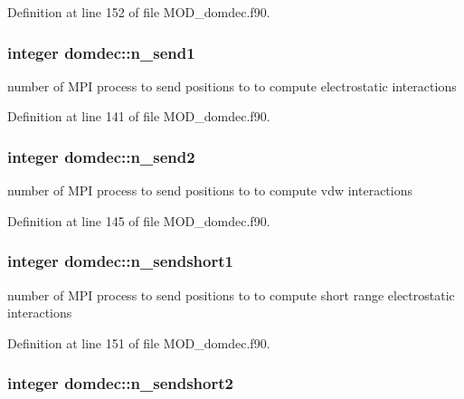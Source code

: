 Definition at line 152 of file M\-O\-D\-\_\-domdec.\-f90.

\hypertarget{classdomdec_aa8487a458ef4e84212822190663db9a8}{
\subsubsection[{n\-\_\-send1}]{\setlength{\rightskip}{0pt plus 5cm}integer domdec\-::n\-\_\-send1}}\label{classdomdec_aa8487a458ef4e84212822190663db9a8}


number of M\-P\-I process to send positions to to compute electrostatic interactions 



Definition at line 141 of file M\-O\-D\-\_\-domdec.\-f90.

\hypertarget{classdomdec_a0f486e85808300fa8cc875848802e6bb}{
\subsubsection[{n\-\_\-send2}]{\setlength{\rightskip}{0pt plus 5cm}integer domdec\-::n\-\_\-send2}}\label{classdomdec_a0f486e85808300fa8cc875848802e6bb}


number of M\-P\-I process to send positions to to compute vdw interactions 



Definition at line 145 of file M\-O\-D\-\_\-domdec.\-f90.

\hypertarget{classdomdec_a10cc7f1b63fcc120ac78969e44d907fa}{
\subsubsection[{n\-\_\-sendshort1}]{\setlength{\rightskip}{0pt plus 5cm}integer domdec\-::n\-\_\-sendshort1}}\label{classdomdec_a10cc7f1b63fcc120ac78969e44d907fa}


number of M\-P\-I process to send positions to to compute short range electrostatic interactions 



Definition at line 151 of file M\-O\-D\-\_\-domdec.\-f90.

\hypertarget{classdomdec_a2a12a88a8fa8070ba62c13604c01a8b7}{
\subsubsection[{n\-\_\-sendshort2}]{\setlength{\rightskip}{0pt plus 5cm}integer domdec\-::n\-\_\-sendshort2}}\label{classdomdec_a2a12a88a8fa8070ba62c13604c01a8b7}


